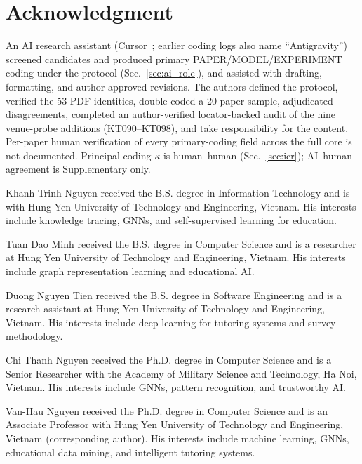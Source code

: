 \documentclass[lettersize,journal]{IEEEtran}
\begin{document}
\section*{Acknowledgment}
An AI research assistant (Cursor~\cite{Cursor_AI_2026}; earlier coding logs also name ``Antigravity'') screened candidates and produced primary PAPER/MODEL/EXPERIMENT coding under the protocol (Sec.~\ref{sec:ai_role}), and assisted with drafting, formatting, and author-approved revisions. The authors defined the protocol, verified the 53 PDF identities, double-coded a 20-paper sample, adjudicated disagreements, completed an author-verified locator-backed audit of the nine venue-probe additions (KT090--KT098), and take responsibility for the content. Per-paper human verification of every primary-coding field across the full core is not documented. Principal coding $\kappa$ is human--human (Sec.~\ref{sec:icr}); AI--human agreement is Supplementary only.


\begin{IEEEbiographynophoto}{Khanh-Trinh Nguyen}
received the B.S. degree in Information Technology and is with Hung Yen University of Technology and Engineering, Vietnam. His interests include knowledge tracing, GNNs, and self-supervised learning for education.
\end{IEEEbiographynophoto}
\begin{IEEEbiographynophoto}{Tuan Dao Minh}
received the B.S. degree in Computer Science and is a researcher at Hung Yen University of Technology and Engineering, Vietnam. His interests include graph representation learning and educational AI.
\end{IEEEbiographynophoto}
\begin{IEEEbiographynophoto}{Duong Nguyen Tien}
received the B.S. degree in Software Engineering and is a research assistant at Hung Yen University of Technology and Engineering, Vietnam. His interests include deep learning for tutoring systems and survey methodology.
\end{IEEEbiographynophoto}
\begin{IEEEbiographynophoto}{Chi Thanh Nguyen}
received the Ph.D. degree in Computer Science and is a Senior Researcher with the Academy of Military Science and Technology, Ha Noi, Vietnam. His interests include GNNs, pattern recognition, and trustworthy AI.
\end{IEEEbiographynophoto}
\begin{IEEEbiographynophoto}{Van-Hau Nguyen}
received the Ph.D. degree in Computer Science and is an Associate Professor with Hung Yen University of Technology and Engineering, Vietnam (corresponding author). His interests include machine learning, GNNs, educational data mining, and intelligent tutoring systems.
\end{IEEEbiographynophoto}
\end{document}
